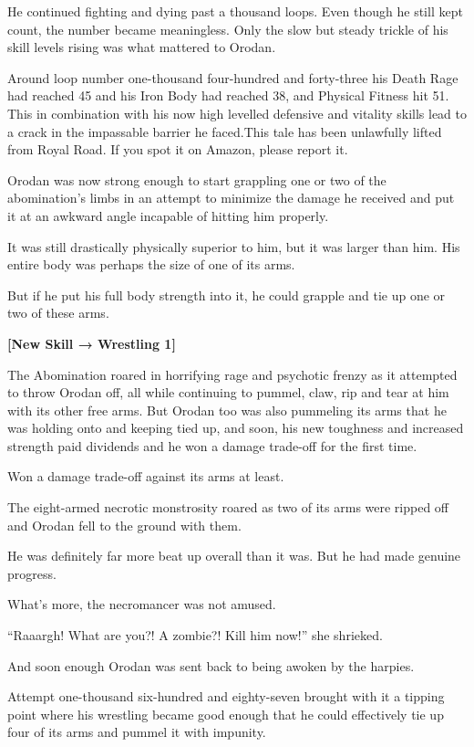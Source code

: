 \documentclass[a4paper,10pt]{book}
\begin{document}
He continued fighting and dying past a thousand loops. Even though he still kept count, the number became meaningless. Only the slow but steady trickle of his skill levels rising was what mattered to Orodan.\par
Around loop number one-thousand four-hundred and forty-three his Death Rage had reached 45 and his Iron Body had reached 38, and Physical Fitness hit 51. This in combination with his now high levelled defensive and vitality skills lead to a crack in the impassable barrier he faced.This tale has been unlawfully lifted from Royal Road. If you spot it on Amazon, please report it.\par
Orodan was now strong enough to start grappling one or two of the abomination’s limbs in an attempt to minimize the damage he received and put it at an awkward angle incapable of hitting him properly.\par
It was still drastically physically superior to him, but it was larger than him. His entire body was perhaps the size of one of its arms.\par
But if he put his full body strength into it, he could grapple and tie up one or two of these arms.\par
\textbf{[New Skill → Wrestling 1]}\par
The Abomination roared in horrifying rage and psychotic frenzy as it attempted to throw Orodan off, all while continuing to pummel, claw, rip and tear at him with its other free arms. But Orodan too was also pummeling its arms that he was holding onto and keeping tied up, and soon, his new toughness and increased strength paid dividends and he won a damage trade-off for the first time.\par
Won a damage trade-off against its arms at least.\par
The eight-armed necrotic monstrosity roared as two of its arms were ripped off and Orodan fell to the ground with them.\par
He was definitely far more beat up overall than it was. But he had made genuine progress.\par
What’s more, the necromancer was not amused.\par
“Raaargh! What are you?! A zombie?! Kill him now!” she shrieked.\par
And soon enough Orodan was sent back to being awoken by the harpies.\par
\par
Attempt one-thousand six-hundred and eighty-seven brought with it a tipping point where his wrestling became good enough that he could effectively tie up four of its arms and pummel it with impunity.\par
\end{document}

